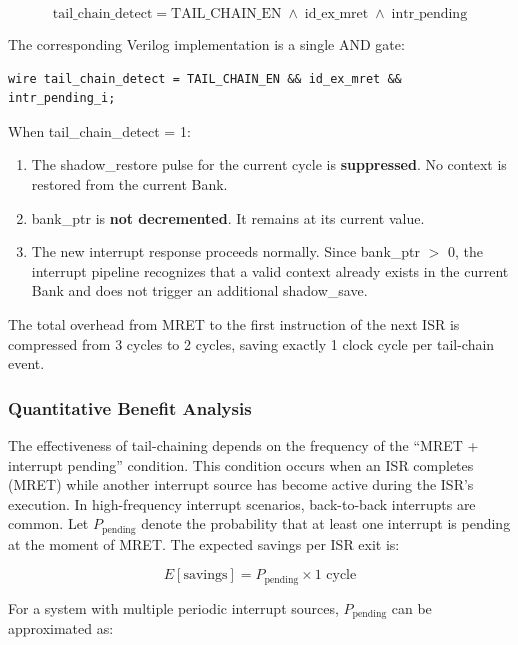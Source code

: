 \documentclass[letterpaper,journal]{IEEEtran}
\begin{document}
\begin{equation}
\text{tail\_chain\_detect} = \text{TAIL\_CHAIN\_EN} \;\land\; \text{id\_ex\_mret} \;\land\; \text{intr\_pending}
\label{eq:tailchain}
\end{equation}

The corresponding Verilog implementation is a single AND gate:

\begin{verbatim}
wire tail_chain_detect = TAIL_CHAIN_EN && id_ex_mret && intr_pending_i;
\end{verbatim}

When tail\_chain\_detect = 1:
\begin{enumerate}
\item The shadow\_restore pulse for the current cycle is \textbf{suppressed}. No context is restored from the current Bank.
\item bank\_ptr is \textbf{not decremented}. It remains at its current value.
\item The new interrupt response proceeds normally. Since bank\_ptr $>$ 0, the interrupt pipeline recognizes that a valid context already exists in the current Bank and does not trigger an additional shadow\_save.
\end{enumerate}

The total overhead from MRET to the first instruction of the next ISR is compressed from 3 cycles to 2 cycles, saving exactly 1 clock cycle per tail-chain event.

\subsubsection{Quantitative Benefit Analysis}

The effectiveness of tail-chaining depends on the frequency of the ``MRET + interrupt pending'' condition.
This condition occurs when an ISR completes (MRET) while another interrupt source has become active during the ISR's execution.
In high-frequency interrupt scenarios, back-to-back interrupts are common.
Let $P_{\text{pending}}$ denote the probability that at least one interrupt is pending at the moment of MRET.
The expected savings per ISR exit is:

\begin{equation}
E[\text{savings}] = P_{\text{pending}} \times 1 \text{ cycle}
\label{eq:savings}
\end{equation}

For a system with multiple periodic interrupt sources, $P_{\text{pending}}$ can be approximated as:
\end{document}
